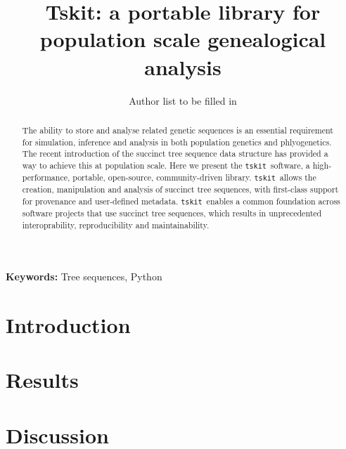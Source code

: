 \documentclass{article}
\newcommand{\tskit}[0]{\texttt{tskit}}
\begin{document}
\title{Tskit: a portable library for population scale genealogical analysis}
\author{Author list to be filled in
}




\maketitle

\begin{abstract}
The ability to store and analyse related genetic sequences is an
essential requirement for simulation, inference and analysis in both
population genetics and phlyogenetics. The recent introduction of the
succinct tree sequence data structure has provided a way to achieve
this at population scale. Here we present the \tskit\ software,
a high-performance, portable, open-source, community-driven library.
\tskit\ allows the creation, manipulation and analysis of succinct tree
sequences, with first-class support for provenance and user-defined metadata.
\tskit\ enables a common foundation across software projects that use
succinct tree sequences, which results in unprecedented interoprability,
reproducibility and maintainability.
\end{abstract}


\textbf{Keywords:} Tree sequences, Python

\section*{Introduction}

\citep{kelleher2018efficient}

\section*{Results}


\section*{Discussion}
\end{document}
